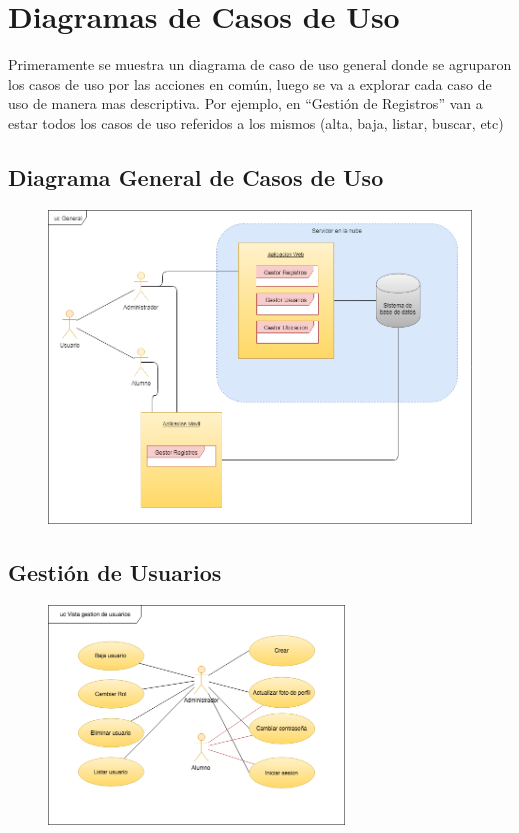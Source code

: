 	\section{Diagramas de Casos de Uso}
		Primeramente se muestra un diagrama de caso de uso general donde se agruparon los casos de uso por las acciones en común, luego se va a explorar cada caso de uso de manera mas descriptiva.
		Por ejemplo, en ``Gestión de Registros'' van a estar todos los casos de uso referidos a los mismos (alta, baja, listar, buscar, etc)

		\subsection{Diagrama General de Casos de Uso}
			\begin{figure}[H]
			\centering
				
				\includegraphics[width=1\textwidth]{imagenes/DiagramasUML/CasoGeneralDeUso.png}
				\label{fig:casos-de-uso}
			\end{figure}

		\subsection{Gestión de Usuarios}
			\begin{figure}[H]
			\centering
				\includegraphics[width=0.7\textwidth]{imagenes/DiagramasUML/gestionDeUsuarios.png}
				\label{fig:casos-de-uso-usuario}
			\end{figure}

